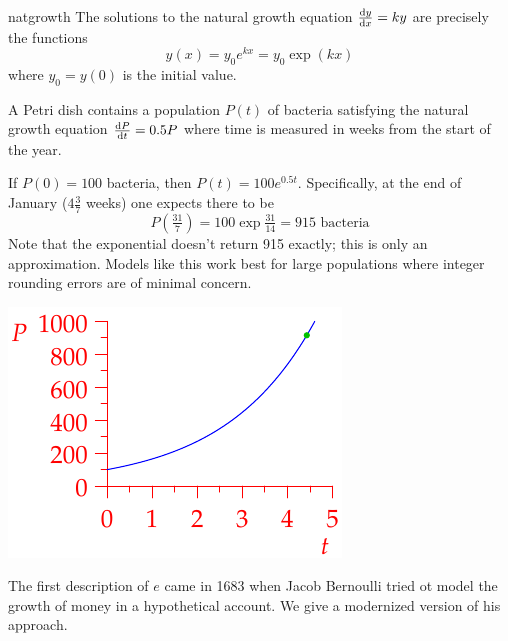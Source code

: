 \begin{thm}{}{natgrowth}
The solutions to the natural growth equation $\diff[y]{x}=ky$ are precisely the functions
\[y(x)=y_0e^{kx} =y_0\exp(kx)\]
where $y_0=y(0)$ is the initial value.
\end{thm}


\begin{example}{}{}
A Petri dish contains a population $P(t)$ of bacteria satisfying the natural growth equation $\diff[P]{t}=0.5P$ where time is measured in weeks from the start of the year.\par
\begin{minipage}[t]{0.63\linewidth}\vspace{-2pt}
If $P(0)=100$ bacteria, then $P(t)=100e^{0.5t}$. Specifically, at the end of January ($4\frac 37$ weeks) one expects there to be
\[P(\tfrac{31}7)=100\exp\tfrac{31}{14}=915\text{ bacteria}\]
Note that the exponential doesn't return 915 exactly; this is only an approximation. Models like this work best for large populations where integer rounding errors are of minimal concern.
\end{minipage}\hfill\begin{minipage}[t]{0.35\linewidth}\vspace{-5pt}
	\flushright\includegraphics{bacteria}
\end{minipage}
\end{example}



The first description of $e$ came in 1683 when Jacob Bernoulli tried ot model the growth of money in a hypothetical account. We give a modernized version of his approach.

